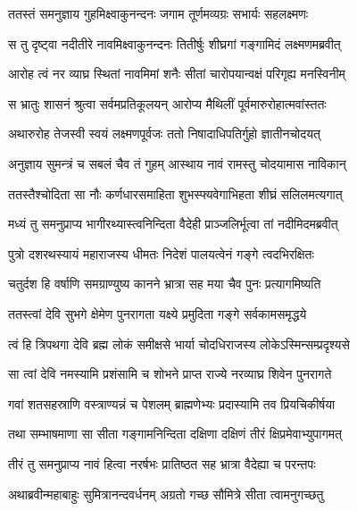 \twolineshloka
{ततस्तं समनुज्ञाय गुहमिक्ष्वाकुनन्दनः}
{जगाम तूर्णमव्यग्रः सभार्यः सहलक्ष्मणः} %

\twolineshloka
{स तु दृष्ट्वा नदीतीरे नावमिक्ष्वाकुनन्दनः}
{तितीर्षुः शीघ्रगां गङ्गामिदं लक्ष्मणमब्रवीत्} %

\twolineshloka
{आरोह त्वं नर व्याघ्र स्थितां नावमिमां शनैः}
{सीतां चारोपयान्वक्षं परिगृह्य मनस्विनीम्} %

\twolineshloka
{स भ्रातुः शासनं श्रुत्वा सर्वमप्रतिकूलयन्}
{आरोप्य मैथिलीं पूर्वमारुरोहात्मवांस्ततः} %

\twolineshloka
{अथारुरोह तेजस्वी स्वयं लक्ष्मणपूर्वजः}
{ततो निषादाधिपतिर्गुहो ज्ञातीनचोदयत्} %

\twolineshloka
{अनुज्ञाय सुमन्त्रं च सबलं चैव तं गुहम्}
{आस्थाय नावं रामस्तु चोदयामास नाविकान्} %

\twolineshloka
{ततस्तैश्चोदिता सा नौः कर्णधारसमाहिता}
{शुभस्फ्यवेगाभिहता शीघ्रं सलिलमत्यगात्} %

\twolineshloka
{मध्यं तु समनुप्राप्य भागीरथ्यास्त्वनिन्दिता}
{वैदेही प्राञ्जलिर्भूत्वा तां नदीमिदमब्रवीत्} %

\twolineshloka
{पुत्रो दशरथस्यायं महाराजस्य धीमतः}
{निदेशं पालयत्वेनं गङ्गे त्वदभिरक्षितः} %

\twolineshloka
{चतुर्दश हि वर्षाणि समग्राण्युष्य कानने}
{भ्रात्रा सह मया चैव पुनः प्रत्यागमिष्यति} %

\twolineshloka
{ततस्त्वां देवि सुभगे क्षेमेण पुनरागता}
{यक्ष्ये प्रमुदिता गङ्गे सर्वकामसमृद्धये} %

\twolineshloka
{त्वं हि त्रिपथगा देवि ब्रह्म लोकं समीक्षसे}
{भार्या चोदधिराजस्य लोकेऽस्मिन्सम्प्रदृश्यसे} %

\twolineshloka
{सा त्वां देवि नमस्यामि प्रशंसामि च शोभने}
{प्राप्त राज्ये नरव्याघ्र शिवेन पुनरागते} %

\twolineshloka
{गवां शतसहस्राणि वस्त्राण्यन्नं च पेशलम्}
{ब्राह्मणेभ्यः प्रदास्यामि तव प्रियचिकीर्षया} %

\twolineshloka
{तथा सम्भाषमाणा सा सीता गङ्गामनिन्दिता}
{दक्षिणा दक्षिणं तीरं क्षिप्रमेवाभ्युपागमत्} %

\twolineshloka
{तीरं तु समनुप्राप्य नावं हित्वा नरर्षभः}
{प्रातिष्ठत सह भ्रात्रा वैदेह्या च परन्तपः} %

\twolineshloka
{अथाब्रवीन्महाबाहुः सुमित्रानन्दवर्धनम्}
{अग्रतो गच्छ सौमित्रे सीता त्वामनुगच्छतु} %

